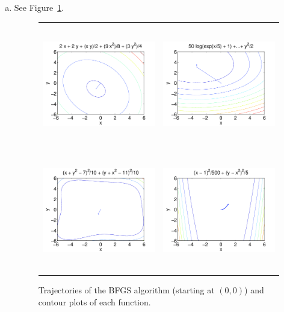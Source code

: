 \documentclass[11pt]{article}
\begin{document}
\begin{enumerate}[(a)]
\item See Figure~\ref{fig:3b}.
\begin{figure}[h]
\centering
\begin{tabular}{cc}
\includegraphics[width=200pt,height=150pt]{3b1}   &
    \includegraphics[width=200pt,height=150pt]{3b2}  \\
\includegraphics[width=200pt,height=150pt]{3b3}   &
    \includegraphics[width=200pt,height=150pt]{3b4}
\end{tabular}
\caption{Trajectories of the BFGS algorithm (starting at $(0,0)$) and contour
plots of each function.}
\label{fig:3b}
\end{figure}


\end{enumerate}
\end{document}
